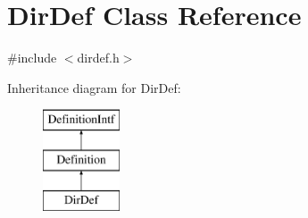 \hypertarget{class_dir_def}{}\section{Dir\+Def Class Reference}
\label{class_dir_def}


{\ttfamily \#include $<$dirdef.\+h$>$}

Inheritance diagram for Dir\+Def\+:\begin{figure}[H]
\begin{center}
\leavevmode
\includegraphics[height=3.000000cm]{class_dir_def}
\end{center}
\end{figure}
